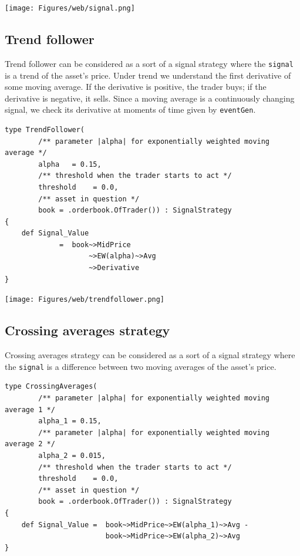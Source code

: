 \documentclass[a4paper,11pt]{article}
\begin{document}
\centerline{\texttt{[image: Figures/web/signal.png]}}

\subsection{Trend follower}\label{trend-follower}

Trend follower can be considered as a sort of a signal strategy where
the \texttt{signal} is a trend of the asset's price. Under trend we
understand the first derivative of some moving average. If the
derivative is positive, the trader buys; if the derivative is negative,
it sells. Since a moving average is a continuously changing signal, we
check its derivative at moments of time given by \texttt{eventGen}.

\begin{verbatim}
type TrendFollower(
        /** parameter |alpha| for exponentially weighted moving average */
        alpha   = 0.15,
        /** threshold when the trader starts to act */
        threshold    = 0.0,
        /** asset in question */
        book = .orderbook.OfTrader()) : SignalStrategy
{
    def Signal_Value
             =  book~>MidPrice
                    ~>EW(alpha)~>Avg
                    ~>Derivative
}
\end{verbatim}


\centerline{\texttt{[image: Figures/web/trendfollower.png]}}

\subsection{Crossing averages
strategy}\label{crossing-averages-strategy}

Crossing averages strategy can be considered as a sort of a signal
strategy where the \texttt{signal} is a difference between two moving
averages of the asset's price.

\begin{verbatim}
type CrossingAverages(
        /** parameter |alpha| for exponentially weighted moving average 1 */
        alpha_1 = 0.15,
        /** parameter |alpha| for exponentially weighted moving average 2 */
        alpha_2 = 0.015,
        /** threshold when the trader starts to act */
        threshold    = 0.0,
        /** asset in question */
        book = .orderbook.OfTrader()) : SignalStrategy
{
    def Signal_Value =  book~>MidPrice~>EW(alpha_1)~>Avg -
                        book~>MidPrice~>EW(alpha_2)~>Avg
}
\end{verbatim}
\end{document}
